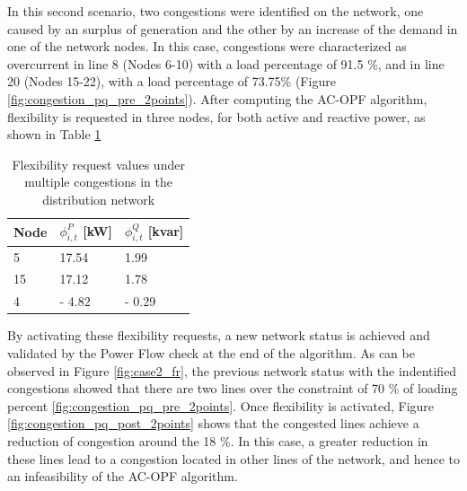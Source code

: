 In this second scenario, two congestions were identified on the network, one caused by an surplus of generation and the other by an increase of the demand in one of the network nodes. In this case, congestions were characterized as overcurrent in line 8 (Nodes 6-10) with a load percentage of 91.5 \%, and in line 20 (Nodes 15-22), with a load percentage of 73.75\% (Figure \ref{fig:congestion_pq_pre_2points}). After computing the AC-OPF algorithm, flexibility is requested in three nodes, for both active and reactive power, as shown in Table \ref{tab:FR_case2}

\begin{table}[htbp]
\centering
\caption{Flexibility request values under multiple congestions in the distribution network}
\label{tab:FR_case2}
\begin{tabular}{lll} 
\toprule
Node & $\phi_{i,t}^{P}$ [kW] & $\phi_{i,t}^{Q}$ [kvar]  \\ 
\hline
5    & 17.54      & 1.99         \\
15    & 17.12      & 1.78          \\
4    & - 4.82      & - 0.29         \\
\bottomrule
\end{tabular}
\end{table}

By activating these flexibility requests, a new network status is achieved and validated by the Power Flow check at the end of the algorithm. As can be observed in Figure \ref{fig:case2_fr}, the previous network status with the indentified congestions showed that there are two lines over the constraint of 70 \% of loading percent \ref{fig:congestion_pq_pre_2points}. Once flexibility is activated, Figure \ref{fig:congestion_pq_post_2points} shows that the congested lines achieve a reduction of congestion around the 18 \%. In this case, a greater reduction in these lines lead to a congestion located in other lines of the network, and hence to an infeasibility of the AC-OPF algorithm. 

